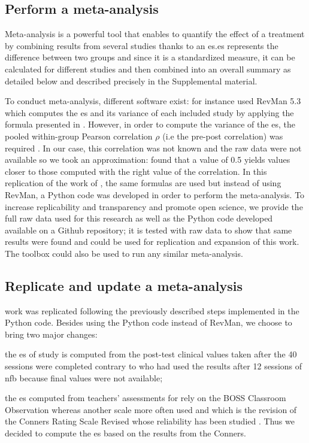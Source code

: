 \subsection{Perform a meta-analysis}

Meta-analysis is a powerful tool that enables to quantify the effect of a treatment by combining results from several studies thanks to 
an \gls{es}.\gls{es} represents the difference between two groups and since it is a standardized measure, it can be calculated for different 
studies and then combined into an overall summary as detailed below and described precisely in the Supplemental material.

To conduct meta-analysis, different software exist: for instance \citet{Cortese2016} used RevMan 5.3 \citep{RevMan} which computes the \gls{es} and its 
variance of each included study by applying the formula presented in \citet{Morris2008}. However, in order to compute the variance of the \gls{es}, 
the pooled within-group Pearson correlation $\rho$ (i.e the pre-post correlation) was required 
\citep{James2013}. In our case, this correlation was not known and the raw data were not available so we took an
 approximation: \citet{Balk2012} found that a value of 0.5 yields values closer to those computed with the right value of the correlation. 
In this replication of the work of \citeauthor{Cortese2016}, the same
formulas are used \citep{Borenstein2009} but instead of using RevMan, a Python code was developed in order to perform the meta-analysis. To increase 
replicability and transparency and promote open science, we provide the full raw data used for this research as well as the Python code 
developed available on a Github repository; it is tested with \citet{Cortese2016} raw data to show that same results were found and could 
be used for replication and expansion of this work. The toolbox could also be used to run any similar meta-analysis.  
 
\subsection{Replicate and update a meta-analysis}

\citeauthor{Cortese2016} work was replicated following the previously described steps implemented in the Python code. Besides using the Python 
code instead of RevMan, we choose to bring two major changes:
\begin{description}
\item the \gls{es} of \citeauthor{Arnold2014} study is computed from the post-test clinical values taken after the 40 sessions were completed 
contrary to \citet{Cortese2016} who had used the results after 12 sessions of \gls{nfb} because final values were not available;
\item the \gls{es} computed from teachers' assessments for \citet{Steiner2014} rely on the BOSS Classroom Observation \citep{Shapiro2010} whereas 
another scale more often used \citep{Christiansen2014, Bluschke2016} and which is the revision of the Conners Rating Scale Revised \citep{Conners1998} 
whose reliability has been studied \citep{Collett2003}. Thus we decided to compute the \gls{es} based on the results from the Conners.  
\end{description} 

